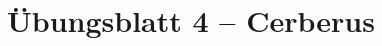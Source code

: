 \documentclass{scrartcl}
\begin{document}
    \setlength{\parindent}{0em}

    \section*{Übungsblatt 4 -- Cerberus}

	
	
\end{document}
